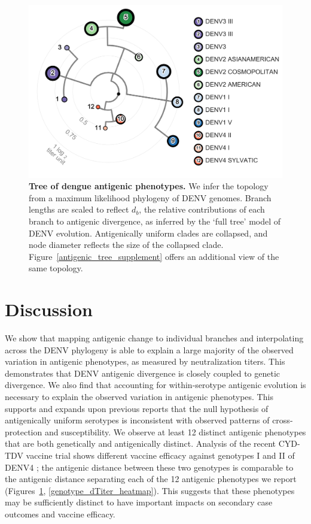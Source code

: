 \begin{figure}[h]
  \begin{centering}
    \includegraphics[width=\linewidth]{./png/antigenic_tree.png}
    \caption{\textbf{Tree of dengue antigenic phenotypes.}
    We infer the topology from a maximum likelihood phylogeny of DENV genomes.
    Branch lengths are scaled to reflect $d_b$, the relative contributions of each branch to antigenic divergence, as inferred by the `full tree' model of DENV evolution.
    Antigenically uniform clades are collapsed, and node diameter reflects the size of the collapsed clade.
    Figure~\ref{antigenic_tree_supplement} offers an additional view of the same topology.
    }
     \label{antigenic_tree}
  \end{centering}
\end{figure}

\section{Discussion}
We show that mapping antigenic change to individual branches and interpolating across the DENV phylogeny is able to explain a large majority of the observed variation in antigenic phenotypes, as measured by neutralization titers.
This demonstrates that DENV antigenic divergence is closely coupled to genetic divergence.
We also find that accounting for within-serotype antigenic evolution is necessary to explain the observed variation in antigenic phenotypes.
This supports and expands upon previous reports \citep{katzelnick2015dengue} that the null hypothesis of antigenically uniform serotypes is inconsistent with observed patterns of cross-protection and susceptibility.
We observe at least 12 distinct antigenic phenotypes that are both genetically and antigenically distinct.
Analysis of the recent CYD-TDV vaccine trial shows different vaccine efficacy against genotypes I and II of DENV4 \citep{juraska2018viral}; the antigenic distance between these two genotypes is comparable to the antigenic distance separating each of the 12 antigenic phenotypes we report (Figures~\ref{antigenic_tree}, \ref{genotype_dTiter_heatmap}).
This suggests that these phenotypes may be sufficiently distinct to have important impacts on secondary case outcomes and vaccine efficacy.


